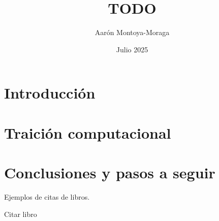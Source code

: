 \documentclass{article}
\title{TODO}
\author{Aarón Montoya-Moraga}
\date{Julio 2025}
\begin{document}
\maketitle

\renewcommand*\contentsname{Tabla de contenidos}
\tableofcontents

\section{Introducción}

\section{Traición computacional}




\section{Conclusiones y pasos a seguir}

Ejemplos de citas de libros.

Citar libro \cite{automateBoringStuffWithPython}


\printbibliography[title={Bibliografía}, heading=bibintoc]
\end{document}
